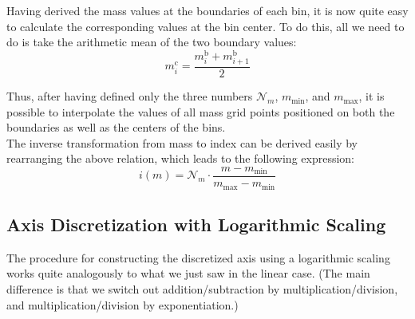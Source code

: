         Having derived the mass values at the boundaries of each bin, it is now quite easy to 
        calculate the corresponding values at the bin center. To do this, all we need to do is take 
        the arithmetic mean of the two boundary values:
        \begin{equation}
            m_i^\text{c}
                =\frac{m_i^\text{b}+m_{i+1}^\text{b}}{2}
        \end{equation}
        
        Thus, after having defined only the three numbers $\mathcal N_m$, $m_\text{min}$, and 
        $m_\text{max}$, it is possible to interpolate the values of all mass grid points positioned 
        on both the boundaries as well as the  centers of the bins. \\
        
        The inverse transformation from mass to index can be derived easily by rearranging the 
        above relation, which leads to the following expression:
        \begin{equation}
            i(m)
                =\mathcal N_m\cdot\frac{m-m_\text{min}}{m_\text{max}-m_\text{min}}
        \end{equation}
        
 
    \subsection{Axis Discretization with Logarithmic Scaling}
    \label{subsec:axis_discretization_with_logarithmic_scale}

        The procedure for constructing the discretized axis using a logarithmic scaling works quite
        analogously to what we just saw in the linear case. (The main difference is that we switch
        out addition/subtraction by multiplication/division, and multiplication/division by
        exponentiation.)
        \\

